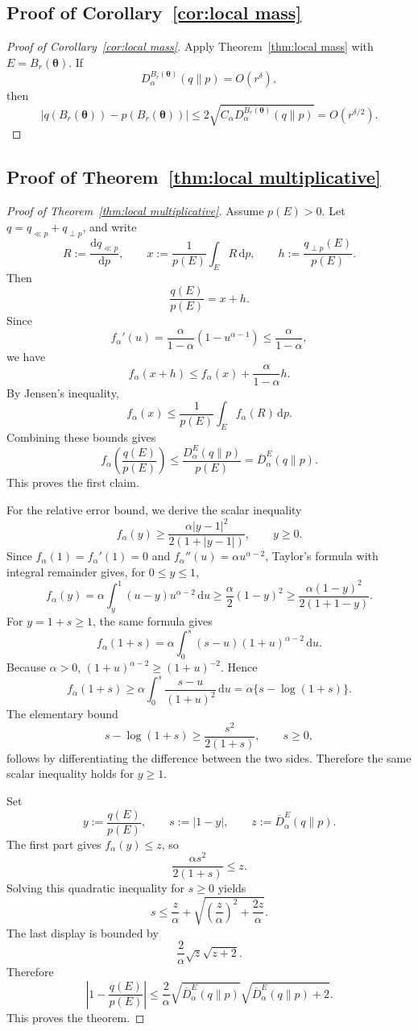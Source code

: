 \documentclass[11pt,a4paper]{article}
\newcommand{\pa}{\boldsymbol\theta}
\theoremstyle{compactplain}
\theoremstyle{compactdefinition}
\numberwithin{equation}{section}
\begin{document}
\subsection*{Proof of Corollary~\ref{cor:local mass}}
\begin{proof}[Proof of Corollary~\ref{cor:local mass}]
Apply Theorem~\ref{thm:local mass} with \(E=B_r(\pa)\). If
\[
 D_\alpha^{B_r(\pa)}(q\|p)=O(r^\delta),
\]
then
\[
 |q(B_r(\pa))-p(B_r(\pa))|
 \le
 2\sqrt{C_\alpha D_\alpha^{B_r(\pa)}(q\|p)}
 =O(r^{\delta/2}).
\]
\end{proof}


\subsection*{Proof of Theorem~\ref{thm:local multiplicative}}
\begin{proof}[Proof of Theorem~\ref{thm:local multiplicative}]
Assume \(p(E)>0\). Let \(q=q_{\ll p}+q_{\perp p}\), and write
\[
 R:=\frac{\mathrm d q_{\ll p}}{\mathrm d p},
 \qquad
 x:=\frac1{p(E)}\int_E R\,\mathrm d p,
 \qquad
 h:=\frac{q_{\perp p}(E)}{p(E)}.
\]
Then
\[
 \frac{q(E)}{p(E)}=x+h.
\]
Since
\[
 f_\alpha'(u)=\frac{\alpha}{1-\alpha}(1-u^{\alpha-1})
 \le \frac{\alpha}{1-\alpha},
\]
we have
\[
 f_\alpha(x+h)
 \le
 f_\alpha(x)+\frac{\alpha}{1-\alpha}h .
\]
By Jensen's inequality,
\[
 f_\alpha(x)
 \le
 \frac1{p(E)}\int_E f_\alpha(R)\,\mathrm d p.
\]
Combining these bounds gives
\[
 f_\alpha\!\left(\frac{q(E)}{p(E)}\right)
 \le
 \frac{D_\alpha^E(q\|p)}{p(E)}
 =\overline D_\alpha^E(q\|p).
\]
This proves the first claim.

For the relative error bound, we derive the scalar inequality
\[
 f_\alpha(y)
 \ge
 \frac{\alpha |y-1|^2}{2(1+|y-1|)},
 \qquad y\ge0 .
\]
Since \(f_\alpha(1)=f_\alpha'(1)=0\) and \(f_\alpha''(u)=\alpha u^{\alpha-2}\),
Taylor's formula with integral remainder gives, for \(0\le y\le1\),
\[
 f_\alpha(y)
 =\alpha\int_y^1 (u-y)u^{\alpha-2}\,\mathrm d u
 \ge \frac{\alpha}{2}(1-y)^2
 \ge
 \frac{\alpha(1-y)^2}{2(1+1-y)}.
\]
For \(y=1+s\ge1\), the same formula gives
\[
 f_\alpha(1+s)
 =\alpha\int_0^s (s-u)(1+u)^{\alpha-2}\,\mathrm d u .
\]
Because \(\alpha>0\), \((1+u)^{\alpha-2}\ge(1+u)^{-2}\). Hence
\[
 f_\alpha(1+s)
 \ge
 \alpha\int_0^s \frac{s-u}{(1+u)^2}\,\mathrm d u
 =\alpha\{s-\log(1+s)\}.
\]
The elementary bound
\[
 s-\log(1+s)\ge \frac{s^2}{2(1+s)},
 \qquad s\ge0,
\]
follows by differentiating the difference between the two sides. Therefore the
same scalar inequality holds for \(y\ge1\).

Set
\[
 y:=\frac{q(E)}{p(E)},
 \qquad
 s:=|1-y|,
 \qquad
 z:=\overline D_\alpha^E(q\|p).
\]
The first part gives \(f_\alpha(y)\le z\), so
\[
 \frac{\alpha s^2}{2(1+s)}\le z .
\]
Solving this quadratic inequality for \(s\ge0\) yields
\[
 s
 \le
 \frac z\alpha
 +
 \sqrt{\left(\frac z\alpha\right)^2+\frac{2z}{\alpha}} .
\]
The last display is bounded by
\[
 \frac2\alpha\sqrt{z}\sqrt{z+2}.
\]
Therefore
\[
 \left|1-\frac{q(E)}{p(E)}\right|
 \le
 \frac2\alpha
 \sqrt{\overline D_\alpha^E(q\|p)}
 \sqrt{\overline D_\alpha^E(q\|p)+2}.
\]
This proves the theorem.
\end{proof}
\end{document}
